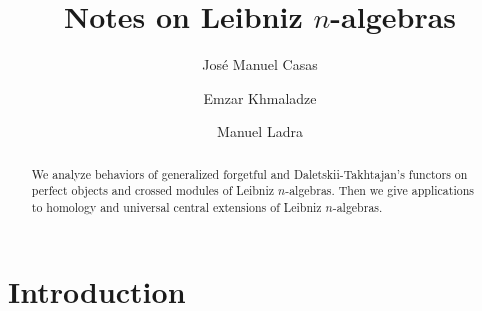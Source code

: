 \documentclass[12pt, reqno]{amsart}
\def\Lb{\operatorname{\textbf{\textsf{Lb}}}}
\def\nLb{\operatorname{{}_{n}\textbf{\textsf{Lb}}}}
\def\qLb{\operatorname{{}_{q}\textbf{\textsf{Lb}}}}
\def\pLb{\operatorname{{}_{p}\textbf{\textsf{Lb}}}}
\def\Set{\operatorname{\textbf{\textsf{Set}}}}
\def\U{\operatorname{\frak{U}}}
\begin{document}
\title[Notes on Leibniz $n$-algebras]{Notes on Leibniz $n$-algebras}

\author[J. M. Casas]{Jos\'e Manuel Casas }
\address{[J. M. Casas] Department of Applied Mathematics I, and CITMAga, E. E. Forestal,  University of Vigo, 36005 Pontevedra, Spain}

\author[E. Khmaladze]{Emzar Khmaladze }
\address{[E. Khmaladze] The University of Georgia, Kostava St. 77a, 0171 Tbilisi, Georgia \& A. Razmadze Mathematical Institute of Tbilisi State University,
	Tamarashvili St. 6, 0177 Tbilisi, Georgia   }

\author[M. Ladra]{Manuel Ladra }
\address{[M. Ladra] Department of Mathematics, CITMAga, Universidade de Santiago de Compostela, 15782 Santiago de Compostela, Spain}




\begin{abstract}
We analyze behaviors of generalized forgetful and Daletskii-Takhtajan's functors on perfect objects and crossed modules of Leibniz $n$-algebras. Then we give applications to homology and universal central extensions of Leibniz $n$-algebras.
\end{abstract}




\maketitle


\def\Lb{\operatorname{\textbf{\textsf{Lb}}}}
\def\nLb{\operatorname{{}_{n}\textbf{\textsf{Lb}}}}
\def\qLb{\operatorname{{}_{q}\textbf{\textsf{Lb}}}}
\def\pLb{\operatorname{{}_{p}\textbf{\textsf{Lb}}}}
\def\Set{\operatorname{\textbf{\textsf{Set}}}}

\def\U{\operatorname{\frak{U}}}
\def\D{\operatorname{\frak{D}}}

\def\ad{\operatorname{\text{ad}}}



\section{Introduction}
\end{document}
